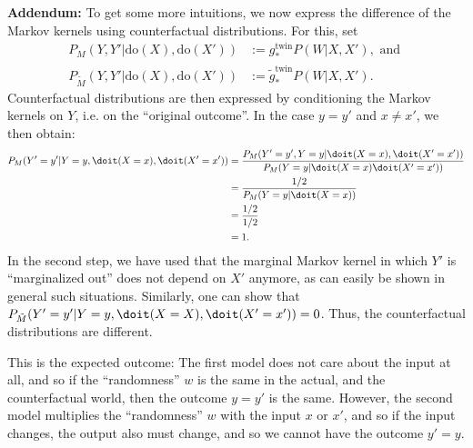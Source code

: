 \begin{enumerate}
\begin{ungradedsolution}
\begin{enumerate}
			\textbf{Addendum:} To get some more intuitions, we now express the difference of the Markov kernels using counterfactual distributions.
			For this, set
			\begin{align*}
				P_{M}(Y, Y' | \text{do}(X), \text{do}(X'))         & := g_{*}^{\text{twin}}P(W | X, X'), \text{ and } \\
				P_{\tilde{M}}(Y, Y' | \text{do}(X), \text{do}(X')) & :=  \tilde{g}_*^{\text{twin}}P(W | X, X').
			\end{align*}
			Counterfactual distributions are then expressed by conditioning the Markov kernels on $Y$, i.e. on the ``original outcome''.
			In the case $y = y'$ and $x \neq x'$, we then obtain:
			\begin{align*}
				P_{M}(Y' = y' | Y = y, \doit(X = x), \doit(X' = x')) & = \frac{P_{M}(Y' = y', Y = y | \doit(X = x), \doit(X' = x'))}{P_{M}(Y = y | \doit(X = x) \doit(X ' = x'))} \\
				                                                     & = \frac{1/2}{P_{M}(Y = y | \doit(X = x))}                                                                  \\
				                                                     & = \frac{1/2}{1/2}                                                                                          \\
				                                                     & = 1.
			\end{align*}
			In the second step, we have used that the marginal Markov kernel in which $Y'$ is ``marginalized out'' does not depend on $X'$ anymore, as can easily be shown in general such situations.
			Similarly, one can show that $P_{\tilde{M}}(Y' = y' | Y = y, \doit(X = X), \doit(X' = x')) = 0$.
			Thus, the counterfactual distributions are different.

			This is the expected outcome: The first model does not care about the input at all, and so if the ``randomness'' $w$ is the same in the actual, and the counterfactual world, then the outcome $y = y'$ is the same.
			However, the second model multiplies the ``randomness'' $w$ with the input $x$ or $x'$, and so if the input changes, the output also must change, and so we cannot have the outcome $y' = y$.



\end{enumerate}
\end{ungradedsolution}
\end{enumerate}
